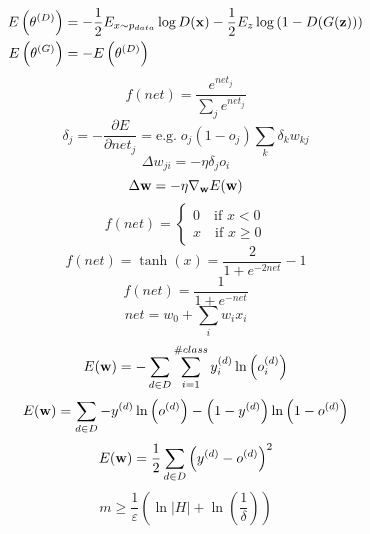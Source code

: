 \documentclass[10pt,fleqn]{minimal}
\begin{document}
{{\begin{align}
	E \left(\theta^{(D)} \right) &= - \frac{1}{2} E_{x \sim p_{data}} \log D(\bold{x}) - \frac{1}{2} E_{z} \log \left(1 - D(G(\bold{z})) \right) \\
	E \left(\theta^{(G)} \right) &= - E \left(\theta^{(D)} \right)
\end{align}
\begin{equation}
	f(net) = \frac{e^{net_j}} {\sum_j e^{net_j}}
\end{equation}
\begin{equation}
	\delta_j = - \frac{\partial E}{\partial net_j} = \text{e.g.} \; o_j (1-o_j) \sum_k \delta_k w_{kj}
\end{equation}
\begin{equation}
	\Delta w_{ji} = - \eta \delta_j o_i
\end{equation}
\begin{equation}
	\Delta \bold{w} = - \eta \nabla_\bold{w} E(\bold{w})
\end{equation}
\begin{equation}
	f(net) = \begin{cases} 0 \quad \text{if } x < 0 \\ x \quad \text{if } x \geq 0 \end{cases}
\end{equation}
\begin{equation}
	f(net) = \tanh(x) = \frac{2}{1+e^{-2net}} - 1
\end{equation}
\begin{equation}
	f(net) = \frac{1}{1 + e^{-net}}
\end{equation}
\begin{equation}
	net = w_0 + \sum_i w_i x_i
\end{equation}
\begin{equation}
	E(\bold{w}) = -\sum_{d \in D} \sum_{i=1}^{\#class} y_i^{(d)} \ln \left( o_i^{(d)}\right)
\end{equation}
\begin{equation}
	E(\bold{w}) = \sum_{d \in D} - y^{(d)} \ln \left( o^{(d)}\right) - \left(1 - y^{(d)}\right) \ln \left( 1-o^{(d)} \right)
\end{equation}
\begin{equation}
	E(\bold{w}) = \frac{1}{2} \sum_{d \in D} \left(y^{(d)} - o^{(d)} \right)^2
\end{equation}
\begin{equation}
	m \geq \frac{1}{\varepsilon} \left( \ln |H| + \ln \left(\frac{1}{\delta} \right) \right)
\end{equation}
}}
\end{document}
